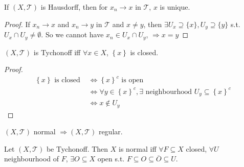 \begin{prop}
    If $(X, \mathcal{T})$ is Hausdorff, then for $x_n \to x$ in $\mathcal{T}$, $x$ is unique.
\end{prop}
\begin{proof}
    If $x_n \to x$ and $x_n \to y$ in $\mathcal{T}$ and $x \neq y$, then $\exists U_x 
    \supseteq \{x\}, U_y \supseteq \{y\}$ s.t. $U_x \cap U_y \neq \emptyset$. So we cannot have
    $x_n \in U_x \cap U_y$, $\Rightarrow x = y$      
\end{proof}

\begin{prop}
    $(X, \mathcal{T})$ is Tychonoff iff $\forall x \in X$, $\left\{ x \right\} $ is closed.  
\end{prop}

\begin{proof}
    \begin{align*}
        \left\{ x \right\} \text{ is closed } 
        & \iff \left\{ x \right\}^c \text{ is open} \\
        & \iff \forall y \in \left\{ x \right\}^c, \exists \text{ neighbourhood } U_y \subseteq 
        \left\{ x \right\}^c \\
        & \iff x \notin U_y 
    \end{align*} \qedhere
\end{proof}

\begin{rem}
    $(X, \mathcal{T})$ normal $\Rightarrow (X, \mathcal{T})$ regular.  
\end{rem}

\begin{prop}
    Let $(X, \mathcal{T})$ be Tychonoff. Then $X$ is normal iff $\forall F \subseteq X$ closed,
    $\forall U$ neighbourhood of $F$, $\exists O \subseteq X$ open s.t. 
    $F \subseteq O \subseteq \overline{O} \subseteq U$.    
\end{prop}

